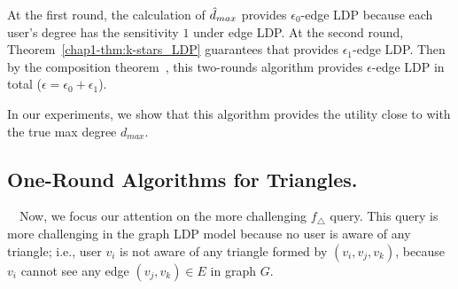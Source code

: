 
At the first round, the calculation of $\hat{d}_{max}$  provides $\epsilon_0$-edge LDP because each user's degree has the sensitivity $1$ under edge LDP. 
At the second round, Theorem~\ref{chap1-thm:k-stars_LDP} guarantees that 
 provides $\epsilon_1$-edge LDP. 
Then by the composition theorem~\cite{DP}, this two-rounds algorithm provides $\epsilon$-edge LDP in total ($\epsilon =\epsilon_0 + \epsilon_1$). 

In our experiments, we show that this algorithm provides the utility close to  with the true max degree $d_{max}$. 

\subsection{One-Round Algorithms for Triangles.}
\label{chap1-sub:non-interactive_triangles}
~~Now, we focus our attention on the more challenging $f_\triangle$ query. This
query is more challenging in the graph LDP model because no user is aware of any
triangle; i.e., user $v_i$ is not aware of any triangle formed by $(v_i, v_j, v_k)$, because $v_i$ cannot see any edge $(v_j, v_k) \in E$ in graph $G$. 

